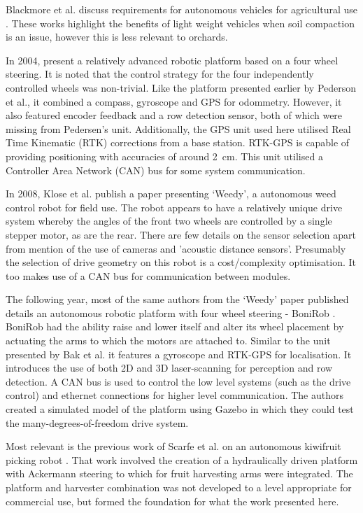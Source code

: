 \documentclass[preprint,authoryear,12pt]{elsarticle}
\begin{document}
    Blackmore et al. discuss requirements for autonomous vehicles for agricultural use \citep{Blackmore2004,Blackmore2007}.
    These works highlight the benefits of light weight vehicles when soil compaction is an issue, however this is less relevant to orchards.
    
    In 2004, \citep{Bak2004} present a relatively advanced robotic platform based on a four wheel steering.
    It is noted that the control strategy for the four independently controlled wheels was non-trivial.
    Like the platform presented earlier by Pederson et al., it combined a compass, gyroscope and GPS for odommetry.
    However, it also featured encoder feedback and a row detection sensor, both of which were missing from Pedersen's unit.
    Additionally, the GPS unit used here utilised Real Time Kinematic (RTK) corrections from a base station.
    RTK-GPS is capable of providing positioning with accuracies of around \SI{2}{\centi\meter}.
    This unit utilised a Controller Area Network (CAN) bus for some system communication.

    In 2008, Klose et al. publish a paper presenting `Weedy', a autonomous weed control robot for field use.
    The robot appears to have a relatively unique drive system whereby the angles of the front two wheels are controlled by a single stepper motor, as are the rear.
    There are few details on the sensor selection apart from mention of the use of cameras and 'acoustic distance sensors'.
    Presumably the selection of drive geometry on this robot is a cost/complexity optimisation.
    It too makes use of a CAN bus for communication between modules.

    The following year, most of the same authors from the `Weedy' paper published details an autonomous robotic platform with four wheel steering - BoniRob \citep{Ruckelshausen2009}.
    BoniRob had the ability raise and lower itself and alter its wheel placement by actuating the arms to which the motors are attached to.
    Similar to the unit presented by Bak et al. it features a gyroscope and RTK-GPS for localisation.
    It introduces the use of both 2D and 3D laser-scanning for perception and row detection.
    A CAN bus is used to control the low level systems (such as the drive control) and ethernet connections for higher level communication.
    The authors created a simulated model of the platform using Gazebo in which they could test the many-degrees-of-freedom drive system.

    Most relevant is the previous work of Scarfe et al. on an autonomous kiwifruit picking robot \cite{scarfe2009, Scarfe2012}.
    That work involved the creation of a hydraulically driven platform with Ackermann steering to which for fruit harvesting arms were integrated.
    The platform and harvester combination was not developed to a level appropriate for commercial use, but formed the foundation for what the work presented here.
    
\end{document}
